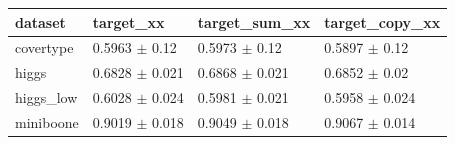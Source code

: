 \begin{tabular}{llll}
\toprule
dataset & target\_xx & target\_sum\_xx & target\_copy\_xx \\
\midrule
covertype & 0.5963 $\pm$ 0.12 & 0.5973 $\pm$ 0.12 & 0.5897 $\pm$ 0.12 \\
higgs & 0.6828 $\pm$ 0.021 & 0.6868 $\pm$ 0.021 & 0.6852 $\pm$ 0.02 \\
higgs\_low & 0.6028 $\pm$ 0.024 & 0.5981 $\pm$ 0.021 & 0.5958 $\pm$ 0.024 \\
miniboone & 0.9019 $\pm$ 0.018 & 0.9049 $\pm$ 0.018 & 0.9067 $\pm$ 0.014 \\
\bottomrule
\end{tabular}
